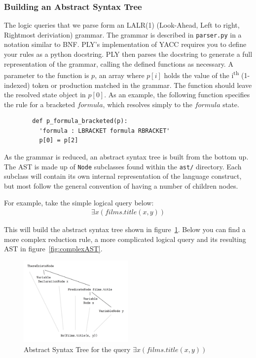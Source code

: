 \documentclass[a4paper, 11pt]{article}
\begin{document}
      \subsubsection{Building an Abstract Syntax Tree}

      The logic queries that we parse form an LALR(1) (Look-Ahead, Left to
      right, Rightmost deriviation) grammar\cite{sittingacrossthere}. The
      grammar is described in \texttt{parser.py} in a notation similar to BNF.
      PLY's implementation of YACC requires you to define your rules as a
      python docstring. PLY then parses the docstring to generate a full
      representation of the grammar, calling the defined functions as
      necessary. A parameter to the function is $p$, an array where $p[i]$
      holds the value of the i\textsuperscript{th} (1-indexed) token or
      production matched in the
      grammar. The function should leave the resolved state object in $p[0]$.
      As an example, the following function specifies the rule for a bracketed
      $formula$, which resolves simply to the $formula$ state. 
      \begin{verbatim}
        def p_formula_bracketed(p):
          'formula : LBRACKET formula RBRACKET'
          p[0] = p[2]
      \end{verbatim}

      As the grammar is reduced, an abstract syntax tree is built from the
      bottom up. The AST is made up of \texttt{Node} subclasses found within
      the \texttt{ast/}
      directory. Each subclass will contain its own internal representation of
      the language construct, but most follow the general convention of having
      a number of children nodes.

      For example, take the simple logical query below:
      \begin{gather}
        \exists x(films.title(x, y))
      \end{gather}

      This will build the abstract syntax tree shown in
      figure~\ref{fig:simpleAST}. Below you can find a more complex reduction rule, 
      a more complicated logical query and its resulting AST in
      figure~\ref{fig:complexAST}.

      \begin{figure}
      \centering
      \includegraphics[width=0.5\textwidth]{images/ASTSimple.png}
      \caption{Abstract Syntax Tree for the query $\exists x(films.title(x, y))$}
      \label{fig:simpleAST}
      \end{figure}
\end{document}
